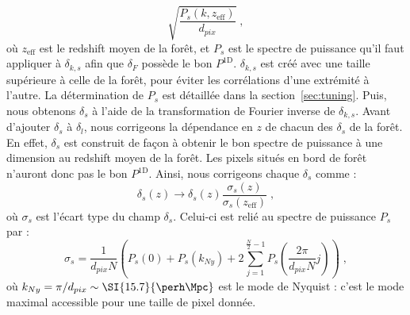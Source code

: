 \begin{equation}
  \sqrt{\frac{P_{s}(k,z_{\mathrm{eff}})}{d_{pix}}} \; ,
\end{equation}
où $z_{\mathrm{eff}}$ est le redshift moyen de la forêt, et $P_{s}$ est le spectre de puissance qu'il faut appliquer à $\delta_{k,s}$ afin que $\delta_F$ possède le bon $P^{\mathrm{1D}}$. $\delta_{k,s}$ est créé avec une taille supérieure à celle de la forêt, pour éviter les corrélations d'une extrémité à l'autre. La détermination de $P_{s}$ est détaillée dans la section~\ref{sec:tuning}. Puis, nous obtenons $\delta_s$ à l'aide de la transformation de Fourier inverse de $\delta_{k,s}$.
  Avant d'ajouter $\delta_s$ à $\delta_l$, nous corrigeons la dépendance en $z$ de chacun des $\delta_s$ de la forêt. En effet, $\delta_s$ est construit de façon à obtenir le bon spectre de puissance à une dimension au redshift moyen de la forêt. Les pixels situés en bord de forêt n'auront donc pas le bon $P^{\mathrm{1D}}$. Ainsi, nous corrigeons chaque $\delta_s$ comme :
  \begin{equation}
    \delta_s(z) \rightarrow \delta_s(z) \frac{\sigma_s(z)}{\sigma_s(z_{\mathrm{eff}})} \; ,
  \end{equation}
  où $\sigma_s$ est l'écart type du champ $\delta_s$. Celui-ci est relié au spectre de puissance $P_{s}$ par :
  \begin{equation}
    \label{eq:sigma_s}
    \sigma_s = \frac{1}{d_{pix}N} \left( P_{s}(0) + P_{s}(k_{Ny}) + 2 \sum_{j=1}^{\frac{N}{2} - 1}P_{s}\left(\frac{2 \pi}{d_{pix}N} j\right)\right) \; ,
  \end{equation}
  où $k_{Ny} = \pi / d_{pix} \sim \SI{15.7}{\perh\Mpc}$ est le mode de Nyquist : c'est le mode maximal accessible pour une taille de pixel donnée.


